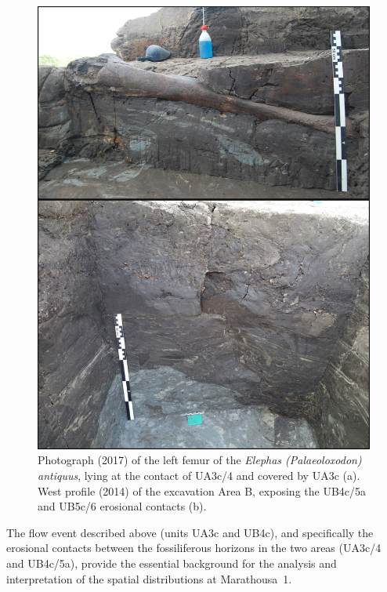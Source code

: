 \documentclass[preprint,authoryear,times]{elsarticle} %
\begin{document}
\begin{figure}[]
  \centering
  \includegraphics[width=1\textwidth]{../artwork/Fig4.png}
  \caption{Photograph (2017) of the left femur of the \emph{Elephas (Palaeoloxodon) antiquus}, lying at the contact of UA3c/4 and covered by UA3c (a). West profile (2014) of the excavation Area B, exposing the UB4c/5a and UB5c/6 erosional contacts (b).}
  \label{fig:4}
\end{figure}

The flow event described above (units UA3c and UB4c), and specifically the erosional contacts between the fossiliferous horizons in the two areas (UA3c/4 and UB4c/5a), provide the essential background for the analysis and interpretation of the spatial distributions at Marathousa~1.
\end{document}
